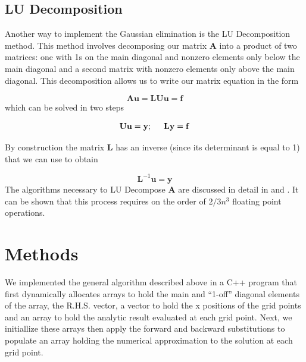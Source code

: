 \documentclass[10pt,showpacs,preprintnumbers,footinbib,amsmath,amssymb,aps,prl,twocolumn,groupedaddress,superscriptaddress,showkeys]{revtex4-1}
\begin{document}
\subsection*{LU Decomposition}

Another way to implement the Gaussian elimination is the LU Decomposition method.
This method involves decomposing our matrix $\mathbf{A}$ into a product of two
matrices: one with 1s on the main diagonal and nonzero elements only below the
main diagonal and a second matrix with nonzero elements only above the main
diagonal. This decomposition allows us to write our matrix equation in the form

\begin{equation*}
	\mathbf{A u} = \mathbf{LU u} = \mathbf{f}
\end{equation*}
which can be solved in two steps

\begin{equation*}
	\mathbf{U u} = \mathbf{y}; \hspace{0.5cm} \mathbf{L y} = \mathbf{f}
\end{equation*}

By construction the matrix $\mathbf{L}$ has an inverse (since its determinant
is equal to 1) that we can use to obtain

\begin{equation*}
	\mathbf{L}^{-1} \mathbf{u} = \mathbf{y}
\end{equation*}
The algorithms necessary to LU Decompose $\mathbf{A}$ are discussed in detail
in \citep{Morten} and \citep{Golub1996}. It can be shown that this process
requires on the order of $2/3 n^3$ floating point operations.

\section{Methods}

We implemented the general algorithm described above in a C++ program
that first dynamically allocates arrays to hold the main and ``1-off''
diagonal elements of the array, the R.H.S. vector, a vector to hold the
x positions of the grid points and an array to hold the analytic
result evaluated at each grid point. Next, we initiallize these arrays
then apply the forward and backward substitutions to populate an array
holding the numerical approximation to the solution at each grid point.

\end{document}
